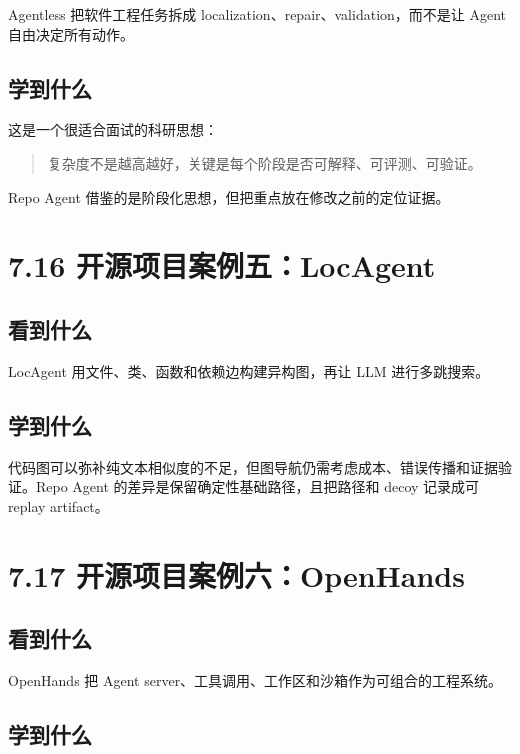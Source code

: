 \documentclass[UTF8,12pt,openany]{ctexbook}
\begin{document}
Agentless 把软件工程任务拆成 localization、repair、validation，而不是让 Agent 自由决定所有动作。\par

\subsection{学到什么}

这是一个很适合面试的科研思想：\par

\begin{quote}
复杂度不是越高越好，关键是每个阶段是否可解释、可评测、可验证。
\end{quote}

Repo Agent 借鉴的是阶段化思想，但把重点放在修改之前的定位证据。\par

\section{7.16 开源项目案例五：LocAgent}

\subsection{看到什么}

LocAgent 用文件、类、函数和依赖边构建异构图，再让 LLM 进行多跳搜索。\par

\subsection{学到什么}

代码图可以弥补纯文本相似度的不足，但图导航仍需考虑成本、错误传播和证据验证。Repo Agent 的差异是保留确定性基础路径，且把路径和 decoy 记录成可 replay artifact。\par

\section{7.17 开源项目案例六：OpenHands}

\subsection{看到什么}

OpenHands 把 Agent server、工具调用、工作区和沙箱作为可组合的工程系统。\par

\subsection{学到什么}
\end{document}

